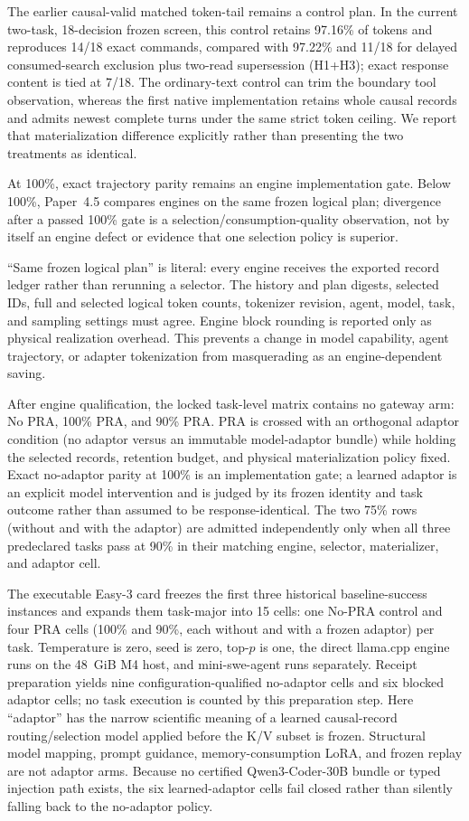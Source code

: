 \documentclass[11pt]{article}
\begin{document}
The earlier causal-valid matched token-tail remains a control plan.  In the
current two-task, 18-decision frozen screen, this control retains 97.16\% of
tokens and reproduces 14/18 exact commands, compared with 97.22\% and 11/18
for delayed consumed-search exclusion plus two-read supersession (H1+H3);
exact response content is tied at 7/18.  The ordinary-text control can trim the
boundary tool observation, whereas the first native implementation retains
whole causal records and admits newest complete turns under the same strict
token ceiling.  We report that materialization difference explicitly rather
than presenting the two treatments as identical.

At 100\%, exact trajectory parity remains an engine implementation gate.
Below 100\%, Paper~4.5 compares engines on the same frozen logical plan;
divergence after a passed 100\% gate is a selection/consumption-quality
observation, not by itself an engine defect or evidence that one selection
policy is superior.

``Same frozen logical plan'' is literal: every engine receives the exported
record ledger rather than rerunning a selector.  The history and plan digests,
selected IDs, full and selected logical token counts, tokenizer revision,
agent, model, task, and sampling settings must agree.  Engine block rounding
is reported only as physical realization overhead.  This prevents a change in
model capability, agent trajectory, or adapter tokenization from masquerading
as an engine-dependent saving.

After engine qualification, the locked task-level matrix contains no gateway
arm: No PRA, 100\% PRA, and 90\% PRA.  PRA is crossed with an orthogonal
adaptor condition (no adaptor versus an immutable model-adaptor bundle) while
holding the selected records, retention budget, and physical materialization
policy fixed.  Exact no-adaptor parity at 100\% is an implementation gate; a
learned adaptor is an explicit model intervention and is judged by its frozen
identity and task outcome rather than assumed to be response-identical.  The
two 75\% rows (without and with the adaptor) are admitted independently only
when all three predeclared tasks pass at 90\% in their matching engine,
selector, materializer, and adaptor cell.

The executable Easy-3 card freezes the first three historical baseline-success
instances and expands them task-major into 15 cells: one No-PRA control and
four PRA cells (100\% and 90\%, each without and with a frozen adaptor) per
task.  Temperature is zero, seed is zero, top-$p$ is one, the direct llama.cpp
engine runs on the 48~GiB M4 host, and mini-swe-agent runs separately.  Receipt
preparation yields nine configuration-qualified no-adaptor cells and six
blocked adaptor cells; no task execution is counted by this preparation step.
Here ``adaptor'' has the narrow scientific meaning of a learned causal-record
routing/selection model applied before the K/V subset is frozen.  Structural
model mapping, prompt guidance, memory-consumption LoRA, and frozen replay are
not adaptor arms.  Because no certified Qwen3-Coder-30B bundle or typed
injection path exists, the six learned-adaptor cells fail closed rather than
silently falling back to the no-adaptor policy.
\end{document}
